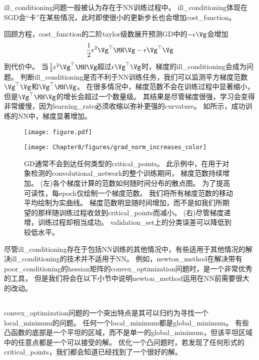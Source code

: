 \gls{ill_conditioning}问题一般被认为存在于\gls{NN}训练过程中。
\gls{ill_conditioning}体现在\gls{SGD}会``卡''在某些情况，此时即使很小的更新步长也会增加\gls{cost_function}。

回顾方程，\gls{cost_function}的二阶\gls{taylor}级数展开预测\gls{GD}中的$-\epsilon\Vg$会增加
\begin{equation}
    \frac{1}{2} \epsilon^2 \Vg^\top \MH\Vg - \epsilon\Vg^\top\Vg
\end{equation}
到代价中。
当$\frac{1}{2} \epsilon^2 \Vg^\top\MH\Vg$超过$\epsilon\Vg^\top\Vg$时，梯度的\gls{ill_conditioning}会成为问题。
判断\gls{ill_conditioning}是否不利于\gls{NN}训练任务，我们可以监测平方梯度范数$\Vg^\top\Vg$和$\Vg^\top \MH\Vg$。
在很多情况中，梯度范数不会在训练过程中显著缩小，但是$\Vg^\top\MH\Vg$的增长会超过一个数量级。
其结果是尽管梯度很强，学习会变得非常缓慢，因为\gls{learning_rate}必须收缩以弥补更强的\gls{curvature}。
如所示，成功训练的\gls{NN}中，梯度显著增加。

\begin{figure}[!htb]
\ifOpenSource
\centerline{\texttt{[image: figure.pdf]}}
\else
\centerline{\texttt{[image: Chapter8/figures/grad\_norm\_increases\_color]}}
\fi
\caption{\gls{GD}通常不会到达任何类型的\gls{critical_points}。
此示例中，在用于对象检测的\gls{convolutional_network}的整个训练期间， 梯度范数持续增加。
(左)各个梯度计算的范数如何随时间分布的散点图。
为了提高可读性，每\gls{epoch}仅绘制一个梯度范数。 
我们将所有梯度范数的移动平均绘制为实曲线。
梯度范数明显随时间增加，而不是如我们所期望的那样随训练过程收敛到\gls{critical_points}而减小。
(右)尽管梯度递增，训练过程却相当成功。 
\gls{validation_set}上的分类误差可以降低到较低水平。
}
\label{fig:chap8_grad_norm_increases}
\end{figure}


尽管\gls{ill_conditioning}存在于包括\gls{NN}训练的其他情况中，有些适用于其他情况的解决\gls{ill_conditioning}的技术并不适用于\gls{NN}。
例如，\gls{newton_method}在解决带有\gls{poor_conditioning}的\gls{hessian}矩阵的\gls{convex_optimization}问题时，是一个非常优秀的工具，
但是我们将会在以下小节中说明\gls{newton_method}运用在\gls{NN}前需要很大的改动。


\subsection{}
\label{sec:local_minima}
\gls{convex_optimization}问题的一个突出特点是其可以归约为寻找一个\gls{local_minimum}的问题。
任何一个\gls{local_minimum}都是\gls{global_minimum}。
有些凸函数的底部是一个平坦的区域，而不是单一的\gls{global_minimum}，但该平坦区域中的任意点都是一个可以接受的解。
优化一个凸问题时，若发现了任何形式的\gls{critical_points}，我们都会知道已经找到了一个很好的解。


